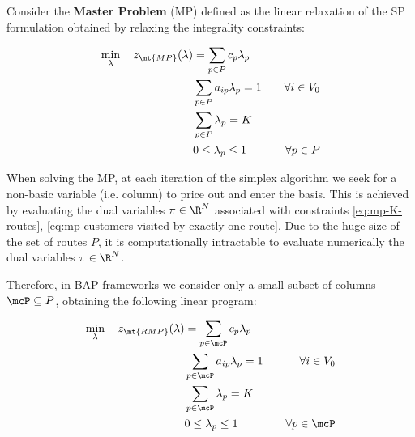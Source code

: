 Consider the \textbf{Master Problem} (MP) defined
as the linear relaxation of the SP formulation obtained by relaxing the integrality constraints:

\begin{align}
	\min_{\lambda} \quad z_\mt{MP}(\lambda) & = \sum_{p \in P}  c_p \lambda_p \label{eq:mp-obj-func}                                                                                                                             \\
	                                        & \sum_{p \in P}  a_{ip} \lambda_p = 1                   & \quad \forall i \in V_0                                              \label{eq:mp-customers-visited-by-exactly-one-route} \\
	                                        & \sum_{p \in P} \lambda_{p} = K\label{eq:mp-K-routes}                                                                                                                               \\
	                                        & 0 \le \lambda_p \le 1                                  & \quad \forall p \in P \label{eq:mp-lambda-mip-var-bounds}
\end{align}


When solving the MP,
at each iteration of the simplex algorithm \parencite{dantzig1955} we seek for a non-basic variable (i.e. column)
to price out and enter the basis.
This is achieved by evaluating the dual variables $\pi \in \R^{N}$
associated with constraints \eqref{eq:mp-K-routes}, \eqref{eq:mp-customers-visited-by-exactly-one-route}.
Due to the huge size of the set of routes $P$,
it is computationally intractable to evaluate numerically the dual variables $\pi \in \R^{N}$.

\medskip

Therefore, in BAP frameworks we consider only a small subset of columns $\mcP \subseteq P$,
obtaining the following linear program:

\begin{align}
	\min_{\lambda} \quad z_\mt{RMP}(\lambda) & = \sum_{p \in \mcP}  c_p \lambda_p \label{eq:rmp-obj-func}                                                                                                                              \\
	                                         & \sum_{p \in \mcP}  a_{ip} \lambda_p = 1                    & \quad \forall i \in V_0                                              \label{eq:rmp-customers-visited-by-exactly-one-route} \\
	                                         & \sum_{p \in \mcP} \lambda_{p} = K\label{eq:rmp-K-routes}                                                                                                                                \\
	                                         & 0 \le \lambda_p \le 1                                      & \quad \forall p \in \mcP \label{eq:rmp-lambda-mip-var-bounds}
\end{align}

